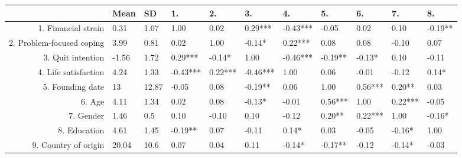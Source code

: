 \begin{table}[ht]
\centering
\begin{tabular}{rllllllllll}
  \hline
 & Mean & SD & 1. & 2. & 3. & 4. & 5. & 6. & 7. & 8. \\ 
  \hline
1. Financial strain & 0.31 & 1.07 &  1.00  &  0.02     &  0.29***  & -0.43***  & -0.05     &  0.02     &  0.10     & -0.19**   \\ 
  2. Problem-focused coping & 3.99 & 0.81 &  0.02     &  1.00  & -0.14*    &  0.22***  &  0.08     &  0.08     & -0.10     &  0.07     \\ 
  3. Quit intention & -1.56 & 1.72 &  0.29***  & -0.14*    &  1.00  & -0.46***  & -0.19**   & -0.13*    &  0.10     & -0.11     \\ 
  4. Life satisfaction & 4.24 & 1.33 & -0.43***  &  0.22***  & -0.46***  &  1.00  &  0.06     & -0.01     & -0.12     &  0.14*    \\ 
  5. Founding date & 13 & 12.87 & -0.05     &  0.08     & -0.19**   &  0.06     &  1.00  &  0.56***  &  0.20**   &  0.03     \\ 
  6. Age & 4.11 & 1.34 &  0.02     &  0.08     & -0.13*    & -0.01     &  0.56***  &  1.00  &  0.22***  & -0.05     \\ 
  7. Gender & 1.46 & 0.5 &  0.10     & -0.10     &  0.10     & -0.12     &  0.20**   &  0.22***  &  1.00  & -0.16*    \\ 
  8. Education & 4.61 & 1.45 & -0.19**   &  0.07     & -0.11     &  0.14*    &  0.03     & -0.05     & -0.16*    &  1.00  \\ 
  9. Country of origin & 20.04 & 10.6 &  0.07     &  0.04     &  0.11     & -0.14*    & -0.17**   & -0.12     & -0.14*    & -0.03     \\ 
   \hline
\end{tabular}
\end{table}
